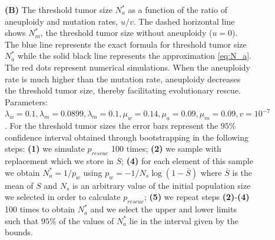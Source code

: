 \documentclass[12pt]{extarticle}
\begin{document}
\begin{figure}
{\textbf{(B)} The threshold tumor size $N_a^*$ as a function of the ratio of aneuploidy and mutation rates, $u/v$. The dashed horizontal line shows $N^*_m$, the threshold tumor size without aneuploidy ($u=0$). The blue line represents the exact formula for threshold tumor size $N_a^*$ while the solid black line represents the approximation \cref{eq:N_a}. The red dots represent numerical simulations.  When the aneuploidy rate is much higher than the mutation rate, aneuploidy decreases the threshold tumor size, thereby facilitating evolutionary rescue. Parameters: $\lambda_w=0.1,\lambda_m=0.0899,\lambda_m=0.1,\mu_w=0.14,\mu_a=0.09,\mu_m=0.09, v=10^{-7}$. For the threshold tumor sizes the error bars represent the $95\%$ confidence interval obtained through bootstrapping in the following steps: \textbf{(1)} we simulate $p_{rescue}$ 100 times; \textbf{(2)} we sample with replacement which we store in $S$; \textbf{(4)} for each element of this sample we obtain $N_a^*=1/p_w$ using $p_w=-1/N_s\log\left(1-\bar{S}\right)$ where $\bar{S}$ is the mean of $S$ and $N_s$ is an arbitrary value of the initial population size we selected in order to calculate $p_{rescue}$; \textbf{(5)} we repeat steps \textbf{(2)}-\textbf{(4)} 100 times to obtain $N_a^*$ and we select the upper and lower limits such that $95\%$ of the values of $N_a^*$ lie in the interval given by the bounds.
}
\label{rescue_threshold}
\end{figure}

\end{document}
